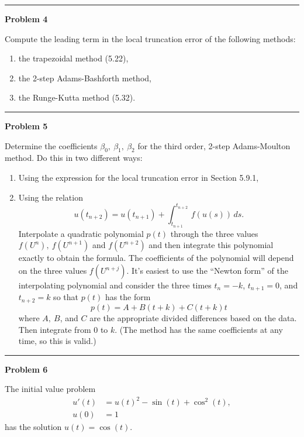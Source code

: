 \documentclass[10pt]{article}
\begin{document}
\vskip 1cm
\hrule
{\bf Problem 4}

Compute the leading term in the local truncation error of the following
methods:
\begin{enumerate}
\item the trapezoidal method (5.22),
\item the 2-step Adams-Bashforth method,
\item the Runge-Kutta method (5.32).
\end{enumerate} 





\vskip 1cm
\hrule
{\bf Problem 5}

Determine the coefficients $\beta_0,~\beta_1,~\beta_2$ for the third
order, 2-step Adams-Moulton method.  Do this in two different ways:
\begin{enumerate} 
 \item Using the expression for the local truncation error in Section 5.9.1,
 \item Using the relation
 \[
 u(t_{n+2}) = u(t_{n+1}) + \int_{t_{n+1}}^{t_{n+2}}\,f(u(s))\,ds.
 \]
 Interpolate  a quadratic polynomial $p(t)$ through the three values
 $f(U^n),~f(U^{n+1})$ and $f(U^{n+2})$ and then integrate this polynomial
 exactly to obtain the formula.  The coefficients of the polynomial will
 depend on the three values $f(U^{n+j})$.   It's easiest to use the
 ``Newton form'' of the interpolating polynomial and consider the three
times $t_n=-k$, $t_{n+1}=0$, and $t_{n+2}=k$ so that $p(t)$ has the form
\[
p(t) = A + B(t+k) + C(t+k)t
\]
where $A,~B$, and $C$ are the appropriate divided differences based on the
data.  Then integrate from $0$ to $k$.   (The method has the same
coefficients at any time, so this is valid.)
\end{enumerate}




\vskip 1cm
\hrule
{\bf Problem 6}

The initial value problem 
\begin{equation}\label{ode1}
\begin{split}
u'(t) &= u(t)^2 - \sin(t) + \cos^2(t),\\
u(0) &= 1
\end{split}
\end{equation}
has the solution $u(t) = \cos(t)$. 
\end{document}
